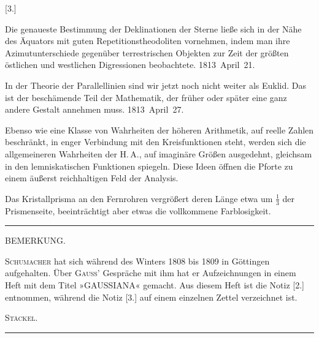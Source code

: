 \bigskip
{}
\centerline{[3.]}

\smallskip

\centerline{}

\smallskip

Die genaueste Bestimmung der Deklinationen der Sterne ließe sich in der Nähe des Äquators mit guten Repetitionstheodoliten vornehmen, indem man ihre Azimutunterschiede gegenüber terrestrischen Objekten zur Zeit der größten östlichen und westlichen Digressionen beobachtete. \hfill\mbox{1813 April 21.}

\smallskip

In der Theorie der Parallellinien sind wir jetzt noch nicht weiter als Euklid. Das ist der beschämende Teil der Mathematik, der früher oder später eine ganz andere Gestalt annehmen muss. \hfill\mbox{1813 April 27.}

\smallskip

Ebenso wie eine Klasse von Wahrheiten der höheren Arithmetik, auf reelle Zahlen beschränkt, in enger Verbindung mit den Kreisfunktionen steht, werden sich die allgemeineren Wahrheiten der H.\,A., auf imaginäre Größen ausgedehnt, gleichsam in den lemniskatischen Funktionen spiegeln. Diese Ideen öffnen die Pforte zu einem äußerst reichhaltigen Feld der Analysis.

\smallskip

Das Kristallprisma an den Fernrohren vergrößert deren Länge etwa um $\frac{1}{3}$
 der Prismenseite, beeinträchtigt aber etwas die vollkommene Farblosigkeit.

\bigskip
\hrule
\bigskip

\centerline{BEMERKUNG.}

\smallskip

\textsc{Schumacher} hat sich während des Winters 1808 bis 1809 in Göttingen aufgehalten. Über \textsc{Gauss}’ Gespräche mit ihm hat er Aufzeichnungen in einem Heft mit dem Titel »GAUSSIANA« gemacht. Aus diesem Heft ist die Notiz [2.] entnommen, während die Notiz [3.] auf einem einzelnen Zettel verzeichnet ist.
\begin{flushright}\textsc{Stäckel}.\end{flushright}

\bigskip
\hrule
